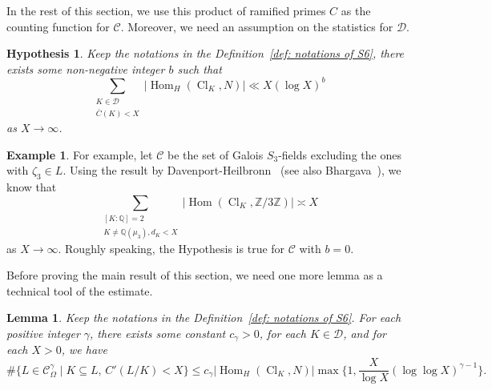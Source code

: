 \documentclass[12pt,a4paper]{amsart}
\numberwithin{equation}{section}%
\theoremstyle{plain}%
\newtheorem{lemma}[theorem]{Lemma}%
\newtheorem{hypothesis}[theorem]{Hypothesis}%
\theoremstyle{definition}%
\newtheorem{example}[theorem]{Example}%
\theoremstyle{remark}%
\begin{document}
    In the rest of this section, we use this product of ramified primes $C$ as the counting function for $\mathcal{C}$.
    Moreover, we need an assumption on the statistics for $\mathcal{D}$.
    \begin{hypothesis}\label{hypthesis}
    	Keep the notations in the Definition~\ref{def: notations of S6}, there exists some non-negative integer $b$ such that
    	\begin{equation*}
    		\sum_{
    			\substack{
    				K\in\mathcal{D}\\
    				\bar{C}(K)<X
    			}
    		}\lvert\operatorname{Hom}_{H}(\operatorname{Cl}_{K},N)\rvert\ll X(\log X)^{b}
    	\end{equation*}
    	as $X\to\infty$.
    \end{hypothesis}
    \begin{example}
    	For example, let $\mathcal{C}$ be the set of Galois $S_{3}$-fields excluding the ones with $\zeta_{3}\in L$.
    	Using the result by Davenport-Heilbronn~\cite{Davenport1971Cubic} (see also Bhargava~\cite{bhargava2013davenport}), we know that
    	\begin{equation*}
    		\sum_{
    			\substack{
    				[K:\mathbb{Q}]=2 \\
    				K\neq\mathbb{Q}(\mu_{3}),d_{K}<X
    			}
    		}\lvert\operatorname{Hom}(\operatorname{Cl}_{K},\mathbb{Z}/3\mathbb{Z})\rvert\asymp X
    	\end{equation*}
    	as $X\to\infty$.
    	Roughly speaking, the Hypothesis is true for $\mathcal{C}$ with $b=0$.
    \end{example}
    Before proving the main result of this section, we need one more lemma as a technical tool of the estimate.
    \begin{lemma}\label{lemma: upper bound estimate S6}
    	Keep the notations in the Definition~\ref{def: notations of S6}.
    	For each positive integer $\gamma$, there exists some constant $c_{\gamma}>0$, for each $K\in\mathcal{D}$, and for each $X>0$, we have
    	\begin{equation*}
    		\#\{L\in\mathcal{C}_{\Omega}^{\gamma}\mid K\subseteq L,\, C'(L/K)<X\}\leq c_{\gamma}\lvert\operatorname{Hom}_{H}(\operatorname{Cl}_{K},N)\rvert\max\{1,\frac{X}{\log X}(\log\log X)^{\gamma-1}\}.
    	\end{equation*}
    \end{lemma}
\end{document}
